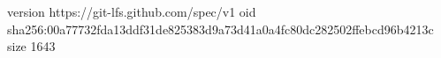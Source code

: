version https://git-lfs.github.com/spec/v1
oid sha256:00a77732fda13ddf31de825383d9a73d41a0a4fc80dc282502ffebcd96b4213c
size 1643
